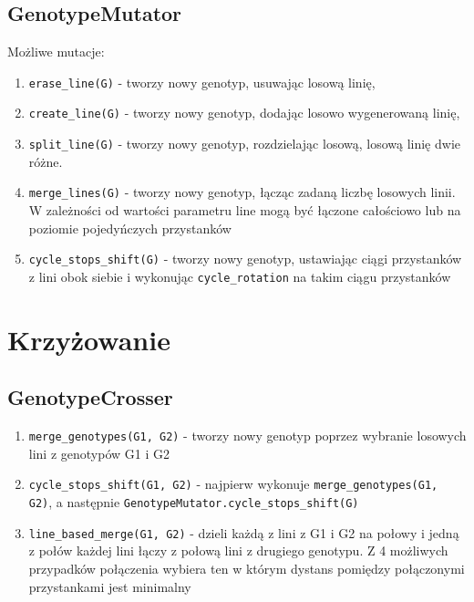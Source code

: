 \documentclass[12pt,a4paper,openright]{mwrep}
\begin{document}
\subsection{GenotypeMutator}

Możliwe mutacje:

\begin{enumerate}
  	\item \lstinline{erase_line(G)} - tworzy nowy genotyp, usuwając losową linię,
    \item \lstinline{create_line(G)} - tworzy nowy genotyp, dodając losowo wygenerowaną linię,
    \item \lstinline{split_line(G)} - tworzy nowy genotyp, rozdzielając losową, losową linię dwie różne.
    \item \lstinline{merge_lines(G)} - tworzy nowy genotyp, łącząc zadaną liczbę losowych linii. W zależności od wartości parametru line mogą być łączone całościowo lub na poziomie pojedyńczych przystanków
    \item \lstinline{cycle_stops_shift(G)} - tworzy nowy genotyp, ustawiając ciągi przystanków z lini obok siebie i wykonując \lstinline{cycle_rotation} na takim ciągu przystanków
\end{enumerate}

\section{Krzyżowanie}

\subsection{GenotypeCrosser}

\begin{enumerate}
  	\item \lstinline{merge_genotypes(G1, G2)} - tworzy nowy genotyp poprzez wybranie losowych lini z genotypów G1 i G2
  	\item \lstinline{cycle_stops_shift(G1, G2)} - najpierw wykonuje \lstinline{merge_genotypes(G1, G2)}, a następnie \lstinline{GenotypeMutator.cycle_stops_shift(G)}
  	\item \lstinline{line_based_merge(G1, G2)} - dzieli każdą z lini z G1 i G2 na połowy i jedną z połów każdej lini łączy z połową lini z drugiego genotypu. Z 4 możliwych przypadków połączenia wybiera ten w którym dystans pomiędzy połączonymi przystankami jest minimalny
\end{enumerate}
\end{document}
